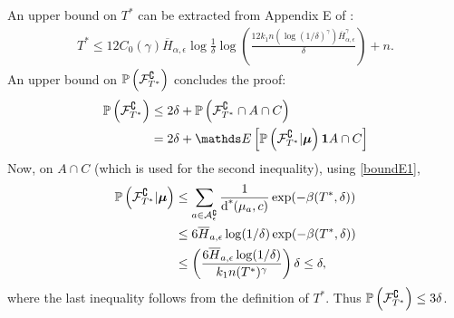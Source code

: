 An upper bound on $T^*$ can be extracted from Appendix E of \cite{COLT13}: 
\begin{align*}
T^* \leq 12C_0(\gamma)\overline{H}_{\alpha,\epsilon}\log\frac{1}{\delta} \log\left(\frac{12k_1n(\log(1/\delta)^\gamma)\overline{H}_{\alpha,\epsilon}^\gamma}{\delta}\right) + n.
\end{align*}
An upper bound on $\mathbb{P}\left(  \mathcal{F}_{T^*}^\complement  \right)$ concludes the proof: 
\begin{align*}
 \Pr{ \cF_{T^*}^\complement }
 	&\leq  2\delta + \Pr{ \cF_{T^*}^\complement \cap A \cap C } \\
	&= 2\delta + \EIN{ \Pr{ \cF_{T^*}^\complement | \bm \ArmMean } \1{A \cap C} }
\end{align*}
Now, on $A\cap C$ (which is used for the second inequality), using \eqref{boundE1},
\begin{align*}
 \mathbb{P}\left(  \mathcal{F}_{T^*}^\complement | \bm {\mu}  \right)
 	&\leq \sum_{a \in \mathcal{A}_{\epsilon}^\complement}
 		\frac{1}{\operatorname{d^*}\hspace{-.2em}\left( \mu_a, c \right)}\exp(-\beta(T^*,\delta)) \\
	&\leq 6\overline{H}_{a,\epsilon}\log(1/\delta)\exp(-\beta(T^*,\delta)) \\
	&\leq \left(\frac{6\overline{H}_{a,\epsilon}\log(1/\delta)}{k_1 n (T^*)^\gamma}\right)  \delta \leq \delta,
\end{align*}
where the last inequality follows from the definition of $T^*$. Thus $\mathbb{P}\left(  \mathcal{F}_{T^*}^\complement  \right) \leq 3\delta$.

